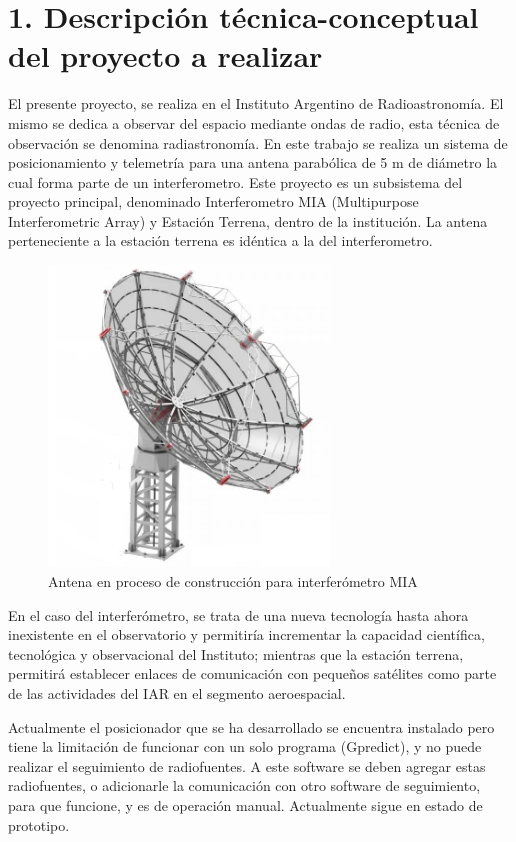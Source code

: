 \documentclass[11pt, %
codirector, %
]{charter}
\begin{document}
\section{1. Descripción técnica-conceptual del proyecto a realizar}
\label{sec:descripcion}
El presente proyecto, se realiza en el Instituto Argentino de Radioastronomía. El mismo se dedica a observar del espacio mediante ondas de radio, esta técnica de observación se denomina radiastronomía. En este trabajo se realiza un sistema de posicionamiento y telemetría para una antena parabólica de 5 m de diámetro la cual forma parte de un interferometro. Este proyecto es un subsistema del proyecto principal, denominado Interferometro MIA (Multipurpose Interferometric Array) y Estación Terrena, dentro de la institución. La antena perteneciente a la estación terrena es idéntica a la del interferometro. 
\begin{figure}[H]
	\centering 
	\includegraphics[height = 8cm ]{Figuras/seccion_1/antena_MIA.png}
	\caption{Antena en proceso de construcción para interferómetro MIA}
	\label{fig:antena_mia}
\end{figure}


En el caso del interferómetro, se trata de una nueva tecnología hasta ahora inexistente en el observatorio y permitiría incrementar la capacidad científica, tecnológica y observacional del Instituto; mientras que la estación terrena, permitirá establecer enlaces de comunicación con pequeños satélites como parte de las actividades del IAR en el segmento aeroespacial.

Actualmente el posicionador que se ha desarrollado se encuentra instalado pero tiene la limitación de funcionar con un solo programa (Gpredict), y no puede realizar el seguimiento de radiofuentes. A este software se deben agregar estas radiofuentes, o adicionarle la comunicación con otro software de seguimiento, para que funcione, y es de operación manual. Actualmente sigue en estado de prototipo.  
\end{document}

